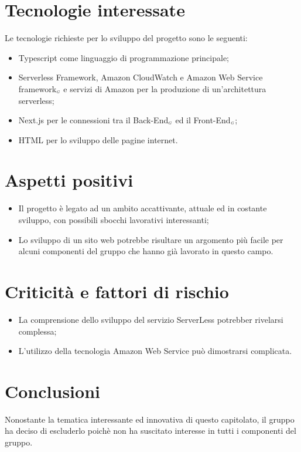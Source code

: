 \section{Tecnologie interessate} \label{C2TecnologieInteressate}
Le tecnologie richieste per lo sviluppo del progetto sono le seguenti:
\begin{itemize}
	\item Typescript come linguaggio di programmazione principale;
	\item Serverless Framework, Amazon CloudWatch e Amazon Web Service framework$_{\scaleto{G}{3pt}}$ e servizi di Amazon per la produzione di un'architettura serverless;
	\item Next.js per le connessioni tra il Back-End$_{\scaleto{G}{3pt}}$ ed il Front-End$_{\scaleto{G}{3pt}}$;
	\item HTML per lo sviluppo delle pagine internet.
\end{itemize}
\section{Aspetti positivi} \label{C2AspettiPositivi}
\begin{itemize}
	\item Il progetto è legato ad un ambito accattivante, attuale ed in costante sviluppo,
	con possibili sbocchi lavorativi interessanti;
	\item Lo sviluppo di un sito web potrebbe risultare un argomento più facile per alcuni componenti del gruppo che hanno già lavorato in questo campo.
\end{itemize}
\section{Criticità e fattori di rischio} \label{C2CriticitàEFattoriDiRischio}
\begin{itemize}
	\item La comprensione dello sviluppo del servizio ServerLess potrebber rivelarsi complessa;
	\item L'utilizzo della tecnologia Amazon Web Service può dimostrarsi complicata.
\end{itemize}
\section{Conclusioni} \label{C2Conclusioni}
Nonostante la tematica interessante ed innovativa di questo capitolato, il gruppo ha deciso di escluderlo poichè non ha suscitato interesse in tutti i componenti del gruppo.
